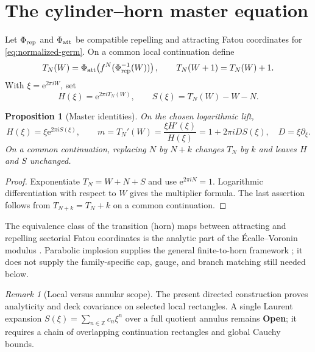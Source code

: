 \documentclass[11pt]{article}
\newtheorem{proposition}[theorem]{Proposition}
\theoremstyle{definition}
\theoremstyle{remark}
\newtheorem{remark}[theorem]{Remark}
\newcommand{\e}{\mathrm e}
\newcommand{\status}[1]{\textsf{\textbf{#1}}}
\begin{document}
\section{The cylinder--horn master equation}

Let $\Phi_{\rm rep}$ and $\Phi_{\rm att}$ be compatible repelling and attracting Fatou coordinates for \cref{eq:normalized-germ}.  On a common local continuation define
\begin{equation}
  T_N(W)=\Phi_{\rm att}\!\left(f^N(\Phi_{\rm rep}^{-1}(W))\right),
  \qquad T_N(W+1)=T_N(W)+1.
  \label{eq:transition}
\end{equation}
With $\xi=\e^{2\pi iW}$, set
\begin{equation}
  H(\xi)=\e^{2\pi iT_N(W)},
  \qquad
  S(\xi)=T_N(W)-W-N.
  \label{eq:horn-def}
\end{equation}

\begin{proposition}[Master identities]\label{prop:horn-master}
On the chosen logarithmic lift,
\begin{equation}
  H(\xi)=\xi\e^{2\pi iS(\xi)},
  \qquad
  m=T_N'(W)=\frac{\xi H'(\xi)}{H(\xi)}
  =1+2\pi iD S(\xi),
  \quad D=\xi\partial_\xi.
  \label{eq:master}
\end{equation}
On a common continuation, replacing $N$ by $N+k$ changes $T_N$ by $k$ and leaves $H$ and $S$ unchanged.
\end{proposition}

\begin{proof}
Exponentiate $T_N=W+N+S$ and use $\e^{2\pi iN}=1$.  Logarithmic differentiation with respect to $W$ gives the multiplier formula.  The last assertion follows from $T_{N+k}=T_N+k$ on a common continuation.
\end{proof}

The equivalence class of the transition (horn) maps between attracting and repelling sectorial Fatou coordinates is the analytic part of the Écalle--Voronin modulus \citep{Ecalle1985,Voronin1981}.  Parabolic implosion supplies the general finite-to-horn framework \citep{Shishikura2000}; it does not supply the family-specific cap, gauge, and branch matching still needed below.

\begin{remark}[Local versus annular scope]
The present directed construction proves analyticity and deck covariance on selected local rectangles.  A single Laurent expansion $S(\xi)=\sum_{n\in\mathbb Z}c_n\xi^n$ over a full quotient annulus remains \status{Open}; it requires a chain of overlapping continuation rectangles and global Cauchy bounds.
\end{remark}
\end{document}
